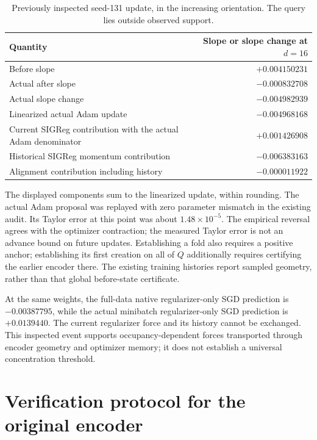 \documentclass[11pt]{article}
\begin{document}
\begin{table}[htbp]
\centering
\small
\begin{tabularx}{\linewidth}{@{}Xr@{}}
\toprule
Quantity & Slope or slope change at $d=16$\\
\midrule
Before slope & $+0.004150231$\\
Actual after slope & $-0.000832708$\\
Actual slope change & $-0.004982939$\\
Linearized actual Adam update & $-0.004968168$\\
Current SIGReg contribution with the actual Adam denominator & $+0.001426908$\\
Historical SIGReg momentum contribution & $-0.006383163$\\
Alignment contribution including history & $-0.000011922$\\
\bottomrule
\end{tabularx}
\caption{Previously inspected seed-131 update, in the increasing orientation. The query lies outside observed support.}
\label{tab:birth}
\end{table}

The displayed components sum to the linearized update, within rounding.
The actual Adam proposal was replayed with zero parameter mismatch in
the existing audit. Its Taylor error at this point was about
\(1.48\times10^{-5}\). The empirical reversal agrees with the optimizer
contraction; the measured Taylor error is not an advance bound on future
updates. Establishing a fold also requires a positive anchor;
establishing its first creation on all of \(Q\) additionally requires
certifying the earlier encoder there. The existing training histories
report sampled geometry, rather than that global before-state
certificate.

At the same weights, the full-data native regularizer-only SGD
prediction is \(-0.00387795\), while the actual minibatch
regularizer-only SGD prediction is \(+0.0139440\). The current
regularizer force and its history cannot be exchanged. This inspected
event supports occupancy-dependent forces transported through encoder
geometry and optimizer memory; it does not establish a universal
concentration threshold.

\clearpage
\section{Verification protocol for the original
encoder}\label{verification-protocol-for-the-original-encoder}
\end{document}
